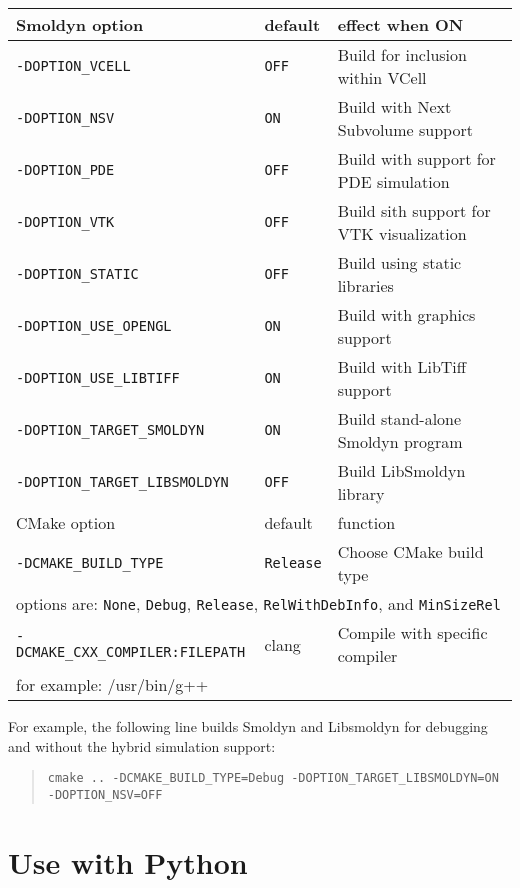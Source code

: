\documentclass {book}
\begin{document}
\begin{longtable}[c]{lll}
Smoldyn option & default & effect when ON\\
\hline
\texttt{-DOPTION\_VCELL} & \texttt{OFF} & Build for inclusion within VCell\\
\texttt{-DOPTION\_NSV} & \texttt{ON} & Build with Next Subvolume support\\
\texttt{-DOPTION\_PDE} & \texttt{OFF} & Build with support for PDE simulation\\
\texttt{-DOPTION\_VTK} & \texttt{OFF} & Build sith support for VTK visualization\\
\texttt{-DOPTION\_STATIC} & \texttt{OFF} & Build using static libraries\\
\texttt{-DOPTION\_USE\_OPENGL} & \texttt{ON} & Build with graphics support\\
\texttt{-DOPTION\_USE\_LIBTIFF} & \texttt{ON} & Build with LibTiff support\\
\texttt{-DOPTION\_TARGET\_SMOLDYN} & \texttt{ON} & Build stand-alone Smoldyn program\\
\texttt{-DOPTION\_TARGET\_LIBSMOLDYN} & \texttt{OFF} & Build LibSmoldyn library\\
\hline
CMake option & default & function\\
\hline
\texttt{-DCMAKE\_BUILD\_TYPE} & \texttt{Release} & Choose CMake build type\\
\multicolumn{3}{l}{\hspace{0.3in}options are: \texttt{None}, \texttt{Debug}, \texttt{Release}, \texttt{RelWithDebInfo}, and \texttt{MinSizeRel}}\\
\texttt{-DCMAKE\_CXX\_COMPILER:FILEPATH} & clang & Compile with specific compiler\\
\multicolumn{3}{l}{\hspace{0.3in}for example: /usr/bin/g++}\\
\end{longtable}

For example, the following line builds Smoldyn and Libsmoldyn for debugging and without the hybrid simulation support:

\begin{quote}
\lstinline{cmake .. -DCMAKE_BUILD_TYPE=Debug -DOPTION_TARGET_LIBSMOLDYN=ON -DOPTION_NSV=OFF}
\end{quote}

\chapter{Use with Python}
\end{document}

